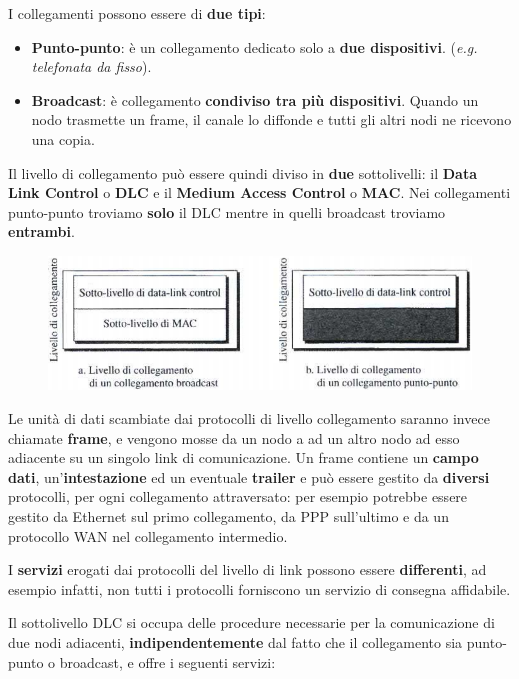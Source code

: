 \documentclass[11pt,a4paper,oneside]{book}
\theoremstyle{definition}
\begin{document}
I collegamenti possono essere di \textbf{due tipi}:

\begin{itemize}
	\item \textbf{Punto-punto}: è un collegamento dedicato solo a \textbf{due dispositivi}. (\textit{e.g. telefonata da fisso}).
	\item \textbf{Broadcast}: è collegamento \textbf{condiviso tra più dispositivi}.
	      Quando un nodo trasmette un frame, il canale lo diffonde e tutti gli altri nodi ne ricevono una copia.
\end{itemize}

Il livello di collegamento può essere quindi diviso in \textbf{due} sottolivelli:
il \textbf{Data Link Control} o \textbf{DLC} e il \textbf{Medium Access Control} o \textbf{MAC}. Nei collegamenti punto-punto troviamo \textbf{solo} il DLC mentre in quelli broadcast troviamo \textbf{entrambi}.

\begin{figure}[!h]
	\includegraphics[scale=0.3]{Immagini/DLCMAC.png}
	\centering
\end{figure}

Le unità di dati scambiate dai protocolli di livello collegamento saranno invece chiamate \textbf{frame}, e vengono mosse da un nodo a ad un altro nodo ad esso adiacente su un singolo link di comunicazione. Un frame contiene un \textbf{campo dati}, un'\textbf{intestazione} ed un eventuale \textbf{trailer} e può essere gestito da \textbf{diversi} protocolli, per ogni collegamento attraversato: per esempio potrebbe essere gestito da Ethernet sul primo collegamento, da PPP sull’ultimo e da un protocollo WAN nel collegamento intermedio.

I \textbf{servizi} erogati dai protocolli del livello di link
possono essere \textbf{differenti}, ad esempio infatti, non tutti i protocolli forniscono un servizio di consegna affidabile.

\pagebreak

Il sottolivello DLC si occupa delle procedure necessarie per la comunicazione di due nodi adiacenti, \textbf{indipendentemente} dal fatto che il collegamento sia punto-punto o broadcast, e offre i seguenti servizi:
\end{document}
